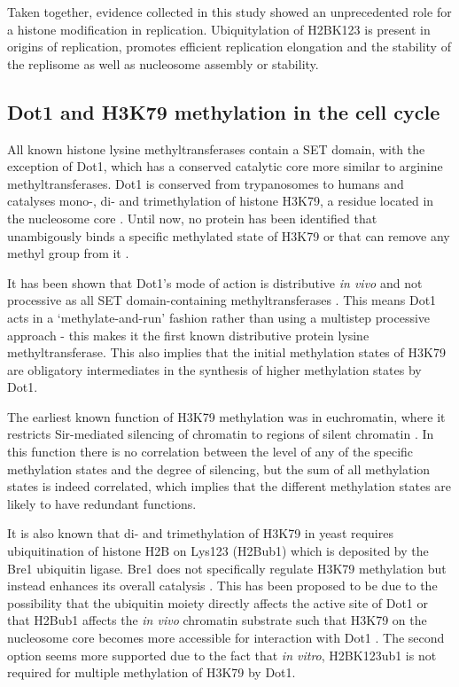 \documentclass[11pt,twoside,a4paper]{report}
\begin{document}
		Taken together, evidence collected in this study \cite{Trujillo2012} showed an unprecedented role for a histone modification in replication. Ubiquitylation of H2BK123 is present in origins of replication, promotes efficient replication elongation and the stability of the replisome as well as nucleosome assembly or stability.
		
		\subsection{Dot1 and H3K79 methylation in the cell cycle}
	
		All known histone lysine methyltransferases contain a SET domain, with the exception of Dot1, which has a conserved catalytic core more similar to arginine methyltransferases. Dot1 is conserved from trypanosomes to humans and catalyses mono-, di- and trimethylation of histone H3K79, a residue located in the nucleosome core \cite{Kouzarides2007}. Until now, no protein has been identified that unambigously binds a specific methylated state of H3K79 or that can remove any methyl group from it \cite{Frederiks2008}.
		
		It has been shown that Dot1's mode of action is distributive \textit{in vivo} and not processive as all SET domain-containing methyltransferases \cite{Frederiks2008}. This means Dot1 acts in a ‘methylate-and-run’ fashion rather than using a multistep processive approach - this makes it the first known distributive protein lysine methyltransferase. This also implies that the initial methylation states of H3K79 are obligatory intermediates in the synthesis of higher methylation states by Dot1.
		
		The earliest known function of H3K79 methylation was in euchromatin, where it restricts Sir-mediated silencing of chromatin to regions of silent chromatin \cite{Frederiks2008}. In this function there is no correlation between the level of any of the specific methylation states and the degree of silencing, but the sum of all methylation states is indeed correlated, which implies that the different methylation states are likely to have redundant functions.
		
		It is also known that di- and trimethylation of H3K79 in yeast requires ubiquitination of histone H2B on Lys123 (H2Bub1) which is deposited by the Bre1 ubiquitin ligase. Bre1 does not specifically regulate H3K79 methylation but instead enhances its overall catalysis \cite{Kouzarides2007} \cite{Frederiks2008}. This has been proposed to be due to the possibility that the ubiquitin moiety directly affects the active site of Dot1 or that H2Bub1 affects the \textit{in vivo} chromatin substrate such that H3K79 on the nucleosome core becomes more accessible for interaction with Dot1 \cite{Frederiks2008}. The second option seems more supported due to the fact that \textit{in vitro}, H2BK123ub1 is not required for multiple methylation of H3K79 by Dot1.
		
\end{document}
